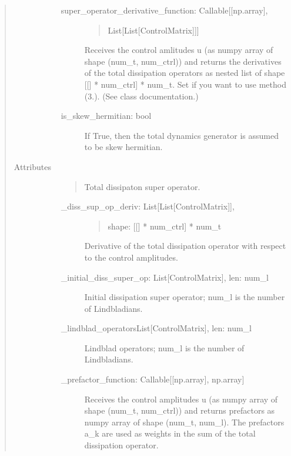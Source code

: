 \documentclass[letterpaper,10pt,english]{sphinxmanual}
\begin{document}
\begin{fulllineitems}
\begin{quote}
\begin{description}
\begin{description}
\begin{description}
\item[{super\_operator\_derivative\_function: Callable{[}{[}np.array{]},}] \leavevmode\begin{quote}

List{[}List{[}ControlMatrix{]}{]}{]}
\end{quote}

Receives the control amlitudes u (as numpy array of shape
(num\_t, num\_ctrl)) and returns the derivatives of the total dissipation
operators as nested list of shape {[}{[}{]} * num\_ctrl{]} * num\_t. Set if you
want to use method (3.). (See class documentation.)

\item[{is\_skew\_hermitian: bool}] \leavevmode
If True, then the total dynamics generator is assumed to be skew
hermitian.

\end{description}

\end{description}

\item[{Attributes}] \leavevmode\begin{description}
\item[{}] \leavevmode\begin{quote}

Total dissipaton super operator.
\end{quote}
\begin{description}
\item[{\_diss\_sup\_op\_deriv: List{[}List{[}ControlMatrix{]}{]},}] \leavevmode\begin{quote}

shape: {[}{[}{]} * num\_ctrl{]} * num\_t
\end{quote}

Derivative of the total dissipation operator with respect to the
control amplitudes.

\item[{\_initial\_diss\_super\_op: List{[}ControlMatrix{]}, len: num\_l}] \leavevmode
Initial dissipation super operator; num\_l is the number of
Lindbladians.

\item[{\_lindblad\_operatorsList{[}ControlMatrix{]}, len: num\_l}] \leavevmode
Lindblad operators; num\_l is the number of Lindbladians.

\item[{\_prefactor\_function: Callable{[}{[}np.array{]}, np.array{]}}] \leavevmode
Receives the control amplitudes u (as numpy array of shape
(num\_t, num\_ctrl)) and returns prefactors as numpy array
of shape (num\_t, num\_l). The prefactors a\_k are used as weights in the
sum of the total dissipation operator.
\begin{quote}


\end{quote}
\end{description}
\end{description}
\end{description}
\end{quote}
\end{fulllineitems}
\end{document}
